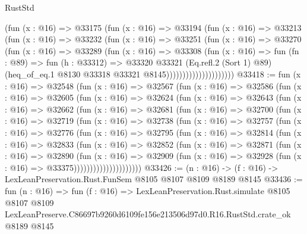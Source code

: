 \begin{lexlean}{RustStd}
\begin{coremodule}
                          (fun (x : @16) =>
                          @33175
                            (fun (x : @16) =>
                            @33194
                              (fun (x : @16) =>
                              @33213
                                (fun (x : @16) =>
                                @33232
                                  (fun (x : @16) =>
                                  @33251
                                    (fun (x : @16) =>
                                    @33270
                                      (fun (x : @16) =>
                                      @33289
                                        (fun (x : @16) =>
                                        @33308
                                          (fun (x : @16) =>
                                          fun (fn : @89) =>
                                          fun (h : @33312) =>
                                          @33320
                                            @33321
                                            (Eq.refl.{2} (Sort 1) @89)
                                            (heq_of_eq.{1}
                                              @8130
                                              @33318
                                              @33321
                                              @8145)))))))))))))))))))))
@33418 := fun (x : @16) =>
  @32548
    (fun (x : @16) =>
    @32567
      (fun (x : @16) =>
      @32586
        (fun (x : @16) =>
        @32605
          (fun (x : @16) =>
          @32624
            (fun (x : @16) =>
            @32643
              (fun (x : @16) =>
              @32662
                (fun (x : @16) =>
                @32681
                  (fun (x : @16) =>
                  @32700
                    (fun (x : @16) =>
                    @32719
                      (fun (x : @16) =>
                      @32738
                        (fun (x : @16) =>
                        @32757
                          (fun (x : @16) =>
                          @32776
                            (fun (x : @16) =>
                            @32795
                              (fun (x : @16) =>
                              @32814
                                (fun (x : @16) =>
                                @32833
                                  (fun (x : @16) =>
                                  @32852
                                    (fun (x : @16) =>
                                    @32871
                                      (fun (x : @16) =>
                                      @32890
                                        (fun (x : @16) =>
                                        @32909
                                          (fun (x : @16) =>
                                          @32928 (fun (x : @16) => @33375)))))))))))))))))))))
@33426 := (n : @16) -> (f : @16) -> LexLeanPreservation.Rust.FunSem @8105 @8107 @8109 @8189 @8145
@33436 := fun (n : @16) =>
  fun (f : @16) =>
  LexLeanPreservation.Rust.simulate
    @8105
    @8107
    @8109
    LexLeanPreserve.C86697b9260d6109fe156e213506d97d0.R16.RustStd.crate_ok
    @8189
    @8145
\end{coremodule}
\end{lexlean}
